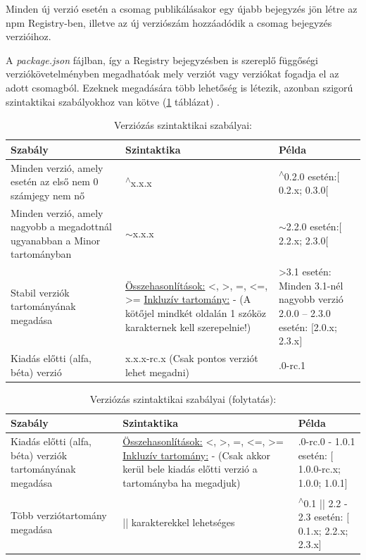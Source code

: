 	Minden új verzió esetén a csomag publikálásakor egy újabb bejegyzés jön létre az npm Registry-ben, illetve az új verziószám hozzáadódik a csomag bejegyzés verzióihoz.
	
	A \emph{package.json} fájlban, így a Registry bejegyzésben is szereplő függőségi verziókövetelményben megadhatóak mely verziót vagy verziókat fogadja el az adott csomagból. Ezeknek megadására több lehetőség is létezik, azonban szigorú szintaktikai szabályokhoz van kötve (\ref{tab:sem-ver-pt1} táblázat) \cite{npm-versioning-semver}.
	\begin{table}[h]
		\centering
		\caption{Verziózás szintaktikai szabályai:}
		\label{tab:sem-ver-pt1}
	\begin{tabularx}{\textwidth} { 
			| >{\centering\arraybackslash}X 
			| >{\centering\arraybackslash}X 
			| >{\centering\arraybackslash}X | }
		\hline
		\textbf{Szabály} & \textbf{Szintaktika} & \textbf{Példa} \\
		\hline
		Minden verzió, amely esetén az első nem 0 számjegy nem nő & \textsuperscript{$\wedge$}x.x.x & \textsuperscript{$\wedge$}0.2.0 esetén:\newline $\big[$0.2.x; 0.3.0$\big[$ \\
		\hline
		Minden verzió, amely nagyobb a megadottnál ugyanabban a Minor tartományban & $\sim$x.x.x & $\sim$2.2.0 esetén:\newline $\big[$2.2.x; 2.3.0$\big[$  \\
		\hline
		Stabil verziók tartományának megadása & \underline{Összehasonlítások:} <, >, =, <=, >= \underline{Inkluzív tartomány:} - (A kötőjel mindkét oldalán 1 szóköz karakternek kell szerepelnie!) & >3.1 esetén: \newline Minden 3.1-nél nagyobb verzió 2.0.0 – 2.3.0 esetén: $\big[$2.0.x; 2.3.x$\big]$ \\
		\hline
		Kiadás előtti (alfa, béta) verzió & x.x.x-rc.x (Csak pontos verziót lehet megadni) & 1.0.0-rc.1 \\
		\hline 
	\end{tabularx}
	\end{table}

	\clearpage

	\begin{table}[h]
		\caption{Verziózás szintaktikai szabályai (folytatás):}
		\label{tab:sem-ver-pt2}
		\begin{tabularx}{\textwidth} { 
				| >{\centering\arraybackslash}X 
				| >{\centering\arraybackslash}X 
				| >{\centering\arraybackslash}X | }
			\hline
			\textbf{Szabály} & \textbf{Szintaktika} & \textbf{Példa} \\
			\hline 
			Kiadás előtti (alfa, béta) verziók tartományának megadása & \underline{Összehasonlítások:} <, >, =, <=, >= \underline{Inkluzív tartomány:} - (Csak akkor kerül bele kiadás előtti verzió a tartományba ha megadjuk) & 1.0.0-rc.0 - 1.0.1 esetén: $\big[$1.0.0-rc.x; 1.0.0; 1.0.1$\big]$ \\
			\hline
			Több verziótartomány megadása & || karakterekkel lehetséges & \textsuperscript{$\wedge$}0.1 ||  2.2 - 2.3 esetén: $\big[$0.1.x; 2.2.x; 2.3.x$\big]$\\
			\hline
		\end{tabularx}
	\end{table}

